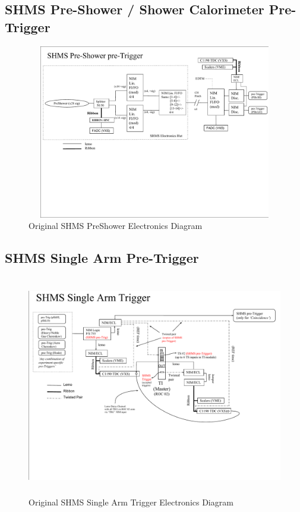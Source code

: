 \documentclass[11pt]{article}
\begin{document}
\begin{appendices}
\subsection{SHMS Pre-Shower / Shower Calorimeter Pre-Trigger}
\label{appendix:Appx7}
\begin{figure}[h!]
  \centering
  \includegraphics[width=7.0in, height=3.0in]{images/shms_preSh_trigger.pdf}
  \caption{Original SHMS PreShower Electronics Diagram}
  \label{fig:shms_preSh_trg}
\end{figure}
\subsection{SHMS Single Arm Pre-Trigger}
\label{appendix:Appx8}
\begin{figure}[h!]
  \centering
  \includegraphics[width=7.0in, height=3.8in]{images/SHMS_SingleArm_Trigger.pdf}
  \caption{Original SHMS Single Arm Trigger Electronics Diagram}
  \label{fig:shms_one_arm_trg}
\end{figure}
\newpage

\end{appendices}
\end{document}
